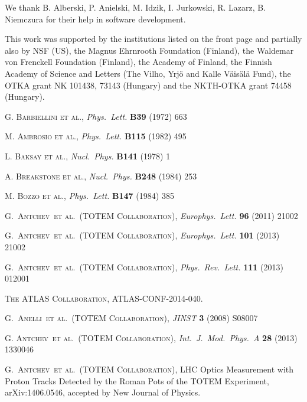 \documentclass[3p,twocolumn]{elsarticle}
\def\etal{et al.}
\def\Name#1{\textsc{#1}, }
\def\REVIEW#1#2#3#4{{\it #1} {\bf #2} (#3) #4}
\begin{document}
We thank B. Alberski, P. Anielski, M. Idzik, I. Jurkowski, R. Lazarz, 
B. Niemczura for their help in software development.

This work was supported by the institutions listed on the front page and 
partially also by NSF (US), the Magnus Ehrnrooth Foundation (Finland), the 
Waldemar von Frenckell Foundation (Finland), the Academy of Finland, the 
Finnish Academy of Science and Letters (The Vilho, Yrj\"o and Kalle 
V\"ais\"al\"a Fund), the OTKA grant NK 101438, 73143 (Hungary) and the 
NKTH-OTKA grant 74458 (Hungary).


\begin{thebibliography}{99}
%
 \Name{G. Barbiellini et al.} \REVIEW{Phys.~Lett.}{B39}{1972}{663}

 \Name{M. Ambrosio et al.} \REVIEW{Phys.~Lett.}{B115}{1982}{495}

 \Name{L. Baksay et al.} \REVIEW{Nucl.~Phys.}{B141}{1978}{1}

 \Name{A. Breakstone et al.} \REVIEW{Nucl.~Phys.}{B248}{1984}{253}

 \Name{M. Bozzo et al.} \REVIEW{Phys.~Lett.}{B147}{1984}{385}

	\Name{G.~Antchev~\etal{}~(TOTEM Collaboration)}
	\REVIEW{Europhys.~Lett.}{96}{2011}{21002}

	\Name{G.~Antchev~\etal{}~(TOTEM Collaboration)}
	\REVIEW{Europhys.~Lett.}{101}{2013}{21002}

	\Name{G.~Antchev~\etal{}~(TOTEM Collaboration)}
	\REVIEW{Phys.~Rev.~Lett.}{111}{2013}{012001}

 \Name{The ATLAS Collaboration} ATLAS-CONF-2014-040.

	\Name{G.~Anelli~\etal{}~(TOTEM Collaboration)}
	\REVIEW{JINST}{3}{2008}{S08007}


	\Name{G. Antchev~\etal{}~(TOTEM Collaboration)}
	\REVIEW{Int.~J.~Mod.~Phys.~A}{28}{2013}{1330046}

	\Name{G.~Antchev~\etal{}~(TOTEM Collaboration)}
	LHC Optics Measurement with Proton Tracks Detected by the Roman Pots of the TOTEM Experiment, 
	arXiv:1406.0546, accepted by New Journal of Physics.


\end{thebibliography}
\end{document}
